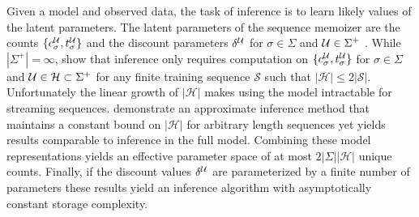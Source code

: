 
Given a model and observed data,  the task of inference is to learn likely values of the latent parameters.  The latent parameters of the sequence memoizer are the counts $\{c^\U_\sigma, t^\U_\sigma \}$ and the discount parameters $\delta^\U$ for $\sigma \in \Sigma$ and  $\U \in \Sigma^{+}$ \citep{Gasthaus2011}. While $|\Sigma^{+}| = \infty$, \citep{Wood2009} show that inference only requires computation on $\{c^\U_\sigma, t^\U_\sigma \}$ for $\sigma \in \Sigma$ and $\U \in \mathcal{H} \subset \Sigma^{+}$ for any finite training sequence $\mathcal{S}$ such that $|\mathcal{H} | \leq 2 |\mathcal{S}|$.  
Unfortunately the linear growth of $|\mathcal{H}|$ makes using the model intractable for streaming sequences. \citep{Bartlett2010} demonstrate an approximate inference method that maintains a constant bound on $|\mathcal{H}| $ for arbitrary length sequences yet yields results comparable to inference in the full model. Combining these model representations yields an effective parameter space of at most $2|\Sigma| |\mathcal{H}|$ unique counts. Finally, if the discount values $\delta^\U$ are parameterized by a finite number of parameters these results yield an inference algorithm with asymptotically constant storage complexity.  

